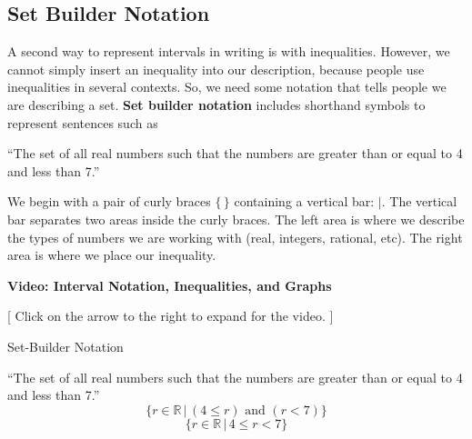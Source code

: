 \documentclass{ximera}
\begin{document}
\subsection*{Set Builder Notation}

\hfill\break

A second way to represent intervals in writing is with inequalities. However, we cannot simply insert an inequality into our description, because people use inequalities in several contexts.  So, we need some notation that tells people we are describing a set. \textbf{Set builder notation} includes shorthand symbols to represent sentences such as 

\begin{center}
``The set of all real numbers such that the numbers are greater than or equal to 4 and less than 7.''
\end{center}

We begin with a pair of curly braces $\{  \, \}$ containing a vertical bar:  ${|}$.  The vertical bar separates two areas inside the curly braces. The left area is where we describe the types of numbers we are working with (real, integers, rational, etc).  The right area is where we place our inequality.












\begin{onlineOnly}
\begin{explanation} \textbf{\textcolor{red!75!green}{Video: Interval Notation, Inequalities, and Graphs}} 

[ Click on the arrow to the right to expand for the video. ]
\begin{expandable} 

\begin{center}
\end{center}

\end{expandable}

\end{explanation}
\end{onlineOnly}





\begin{example} Set-Builder Notation

``The set of all real numbers such that the numbers are greater than or equal to 4 and less than 7.''
\[ \{ r \in \mathbb {R} \, | \, (4 \leq r)  \text{ and } (r < 7) \} \]
\[ \{ r \in \mathbb {R} \, | \, 4 \leq r < 7 \} \]


\end{example}
\end{document}

